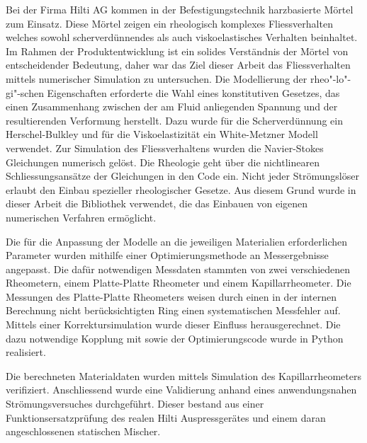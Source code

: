 \thispagestyle{empty}
\begin{abstr}
Bei der Firma Hilti AG kommen in der Befestigungstechnik harzbasierte Mörtel zum Einsatz.
Diese Mörtel zeigen ein rheologisch komplexes Fliessverhalten welches sowohl scherverdünnendes als auch viskoelastisches Verhalten beinhaltet. Im Rahmen der Produktentwicklung ist ein solides Verständnis der Mörtel von entscheidender Bedeutung, daher war das Ziel dieser Arbeit das Fliessverhalten mittels numerischer Simulation zu untersuchen.
Die Modellierung der rheo"-lo"-gi"-schen Eigenschaften erforderte die Wahl eines konstitutiven Gesetzes, das einen Zusammenhang zwischen der am Fluid anliegenden Spannung und der resultierenden Verformung herstellt. Dazu wurde für die Scherverdünnung ein Herschel-Bulkley und für die Viskoelastizität ein White-Metzner Modell verwendet.
Zur Simulation des Fliessverhaltens wurden die Navier-Stokes Gleichungen numerisch gelöst. Die Rheologie geht über die nichtlinearen Schliessungsansätze der Gleichungen in den Code ein. Nicht jeder Strömungslöser erlaubt den Einbau spezieller rheologischer Gesetze.
Aus diesem Grund wurde in dieser Arbeit die Bibliothek \openfoam{} verwendet, die das Einbauen von eigenen numerischen Verfahren ermöglicht.

Die für die Anpassung der Modelle an die jeweiligen Materialien erforderlichen Parameter wurden mithilfe einer Optimierungsmethode an Messergebnisse angepasst. Die dafür notwendigen Messdaten stammten von zwei verschiedenen Rheometern, einem Platte-Platte Rheometer und einem Kapillarrheometer. Die Messungen des Platte-Platte Rheometers weisen durch einen in der internen Berechnung nicht berücksichtigten Ring einen systematischen Messfehler auf. Mittels einer Korrektursimulation wurde dieser Einfluss herausgerechnet. Die dazu not\-wen\-di\-ge Kopplung mit \openfoam{} sowie der Optimierungscode wurde in Python realisiert.

Die berechneten Materialdaten wurden mittels Simulation des Kapillarrheometers verifiziert. Anschliessend wurde eine Validierung anhand eines anwendungsnahen Strömungsversuches durchgeführt. Dieser bestand aus einer Funktionsersatzprüfung des realen Hilti Auspressgerätes und einem daran angeschlossenen statischen Mischer.
\end{abstr}
%
\newpage
{}
%
